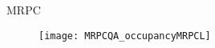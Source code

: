 \documentclass[11pt]{beamer}
\begin{document}

\begin{frame}{MRPC}
  \begin{figure}
    \texttt{[image: MRPCQA\_occupancyMRPCL]}
  \end{figure}
\end{frame}
\end{document}
